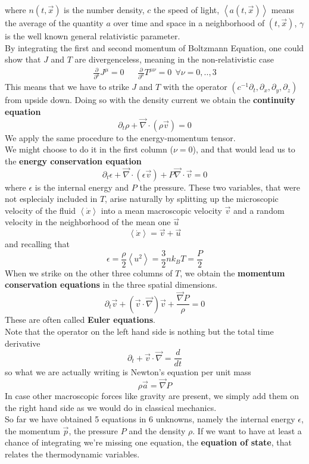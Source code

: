 \documentclass[11pt]{article}
\begin{document}
where $n(t, \vec{x})$ is the number density, $c$ the speed of light,  $\left< a(t,\vec{x}) \right>$ means the average of the quantity $a$ over time and space in a neighborhood of $(t, \vec{x})$, $\gamma$ is the well known general relativistic parameter.\\
By integrating the first and second momentum of Boltzmann Equation, one could show that $J$ and $T$ are divergenceless, meaning in the non-relativistic case
\begin{align}
\frac{\partial }{\partial^{\mu}}J^{\mu}=0 && \frac{\partial }{\partial^{\mu}}T^{\mu \nu}=0 \  \  \forall \nu =0,..,3 
\end{align}
This means that we have to strike $J$ and $T$ with the operator $(c^{-1}\partial_t,\partial_x,\partial_y,\partial_z)$ from upside down. Doing so with the density current we obtain the \textbf{continuity equation}
\begin{equation} \label{cont}
\partial_t \rho + \vec\nabla \cdot (\rho \vec{v})=0
\end{equation}
We apply the same procedure to the energy-momentum tensor.\\
We might choose to do it in the first column ($\nu=0$), and that would lead us to the \textbf{energy conservation equation}
\begin{equation} \label{consen}
\partial_t \epsilon + \vec \nabla \cdot (\epsilon \vec{v}) + P\vec \nabla \cdot \vec{v}=0
\end{equation}
where $\epsilon$ is the internal energy and $P$ the pressure. These two variables, that were not esplecialy included in $T$, arise naturally by splitting up the microscopic velocity of the fluid $\left <  \dot{x} \right >$ into a mean macroscopic velocity $\vec{v}$ and a random velocity in the neighborhood of the mean one $\vec{u}$
$$\left <  \dot{x} \right >= \vec{v}  +  \vec{u} $$
and recalling that 
$$\epsilon = \frac{\rho}{2} \left <  u^2 \right > = \frac{3}{2} n k_B T= \frac{P}{2}$$
When we strike on the other three columns of $T$, we obtain the \textbf{momentum conservation equations} in the three spatial dimensions.
\begin{equation} \label{euler}
\partial_t \vec{v} + (\vec{v} \cdot \vec \nabla) \vec{v} + \frac{\vec \nabla P}{\rho}=0
\end{equation}
These are often called \textbf{Euler equations}. \\
Note that the operator on the left hand side is nothing but the total time derivative
$$
\partial_t + \vec{v} \cdot \vec \nabla = \frac{d}{dt}
$$
so what we are actually writing is Newton's equation per unit mass
$$
\rho \vec{a} = \vec \nabla P
$$
In case other macroscopic forces like gravity are present, we simply add them on the right hand side as we would do in classical mechanics. \\
So far we have obtained 5 equations in 6 unknowns, namely the internal energy $\epsilon$, the momentum $\vec{p}$, the pressure $P$ and the density $\rho$. If we want to have at least a chance of integrating we're missing one equation, the \textbf{equation of state}, that relates the thermodynamic variables.
\end{document}
